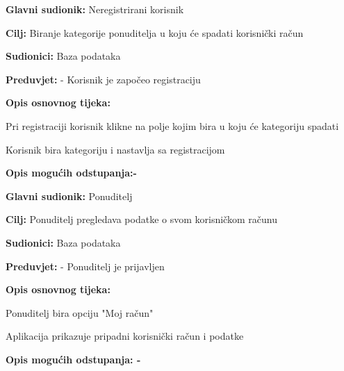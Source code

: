                     \noindent {}
					\begin{packed_item}
	
						\item \textbf{Glavni sudionik: } Neregistrirani korisnik
						\item  \textbf{Cilj:} Biranje kategorije ponuditelja u koju će spadati korisnički račun
						\item  \textbf{Sudionici:} Baza podataka
						\item  \textbf{Preduvjet:} - Korisnik je započeo registraciju
						\item  \textbf{Opis osnovnog tijeka:}
						
						\item[] \begin{packed_enum}
	
							\item Pri registraciji korisnik klikne na polje kojim bira u koju će kategoriju spadati
							\item Korisnik bira kategoriju i nastavlja sa registracijom
						\end{packed_enum}
						
						\item  \textbf{Opis mogućih odstupanja:-}
					
					\end{packed_item}

                    \noindent {}
					\begin{packed_item}
	
						\item \textbf{Glavni sudionik: } Ponuditelj
						\item  \textbf{Cilj:} Ponuditelj pregledava podatke o svom korisničkom računu
						\item  \textbf{Sudionici:} Baza podataka
						\item  \textbf{Preduvjet:} - Ponuditelj je prijavljen
						\item  \textbf{Opis osnovnog tijeka:}
						
						\item[] \begin{packed_enum}
	
							\item Ponuditelj bira opciju "Moj račun"
							\item Aplikacija prikazuje pripadni korisnički račun i podatke
						\end{packed_enum}
						
						\item  \textbf{Opis mogućih odstupanja: -}
						
					\end{packed_item}

